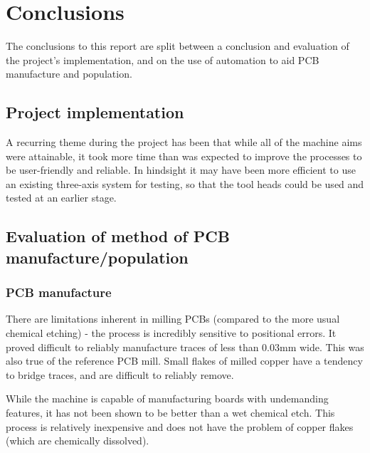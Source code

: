 %
%
	 


\section{Conclusions}
The conclusions to this report are split between a conclusion
and evaluation of the project's implementation, and on the use of automation
to aid PCB manufacture and population.

\subsection{Project implementation}
A recurring theme during the project has been that while all of the machine
aims were attainable, it took more time than was expected to improve
the processes to be user-friendly and reliable. In hindsight it may
have been more efficient to use an existing three-axis system for testing,
so that the tool heads could be used and tested at an earlier stage.

\subsection{Evaluation of method of PCB manufacture/population}

\subsubsection{PCB manufacture}
There are limitations inherent in milling PCBs (compared to the more
usual chemical etching) - the process is incredibly sensitive to positional
errors. It proved difficult to reliably manufacture traces of less than 0.03mm
wide. This was also true of the reference PCB mill. Small flakes of milled
copper have a tendency to bridge traces, and are difficult to reliably remove.

While the machine is capable of manufacturing boards with undemanding
features, it has not been shown to be better than a wet chemical etch.
This process is relatively inexpensive and does not have the problem of 
copper flakes (which are chemically dissolved).

